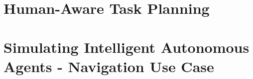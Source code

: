 \documentclass[english,a4paper,12pt,twoside]{StyleThese}
\begin{document}



\cleardoublepage %

\dominitoc
{}

\cleardoublepage %

%

\cleardoublepage



\newpage
\thispagestyle{empty}
\mbox{}

\tableofcontents

\newpage
\thispagestyle{empty}
\mbox{}

\printnoidxglossary[type=\acronymtype]
%

\newpage
\thispagestyle{empty}
\mbox{}

\mainmatter



\newpage
\thispagestyle{empty}
\mbox{}

\part{Human-Aware Task Planning} \label{part:1}






\part{Simulating Intelligent Autonomous Agents - Navigation Use Case} \label{part:2}


\end{document}
